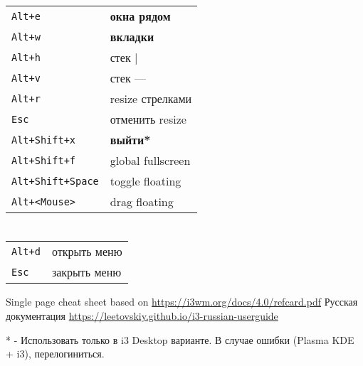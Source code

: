 \begin{multicols}{3}
	\section{}
	\begin{tabular}{@{}ll@{}}
		\verb!Alt+e!           & \textbf{окна рядом} \\
		\verb!Alt+w!           & \textbf{вкладки}    \\
		\verb!Alt+h!           & стек |              \\
		\verb!Alt+v!           & стек ---            \\
		\verb!Alt+r!           & resize стрелками    \\
		\verb!Esc!             & отменить resize     \\
		\verb!Alt+Shift+x!     & \textbf{выйти*}     \\
		\verb!Alt+Shift+f!     & global fullscreen   \\
		\verb!Alt+Shift+Space! & toggle floating     \\
		\verb!Alt+<Mouse>!     & drag floating       \\
	\end{tabular}

	\section{}
	\begin{tabular}{@{}ll@{}}
		\verb!Alt+d! & открыть меню \\
		\verb!Esc!   & закрыть меню \\
	\end{tabular}

	\vspace{.5in}
	Single page cheat sheet based on \url{https://i3wm.org/docs/4.0/refcard.pdf}
	Русская документация \url{https://leetovskiy.github.io/i3-russian-userguide}

\end{multicols}

* - Использовать только в i3 Desktop варианте. В случае ошибки (Plasma KDE + i3), перелогиниться.


